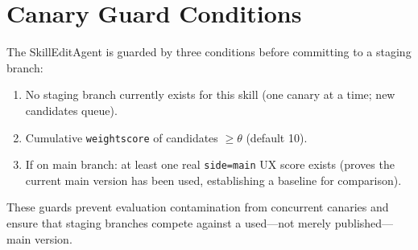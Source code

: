 \documentclass[11pt]{article}
\begin{document}
\section{Canary Guard Conditions}
\label{app:canary-guards}

The SkillEditAgent is guarded by three conditions before committing to a staging branch:
\begin{enumerate}
    \item No staging branch currently exists for this skill (one canary at a time; new candidates queue).
    \item Cumulative \texttt{weightscore} of candidates $\geq \theta$ (default 10).
    \item If on main branch: at least one real \texttt{side=main} UX score exists (proves the current main version has been used, establishing a baseline for comparison).
\end{enumerate}

These guards prevent evaluation contamination from concurrent canaries and ensure that staging branches compete against a used---not merely published---main version.
\end{document}
